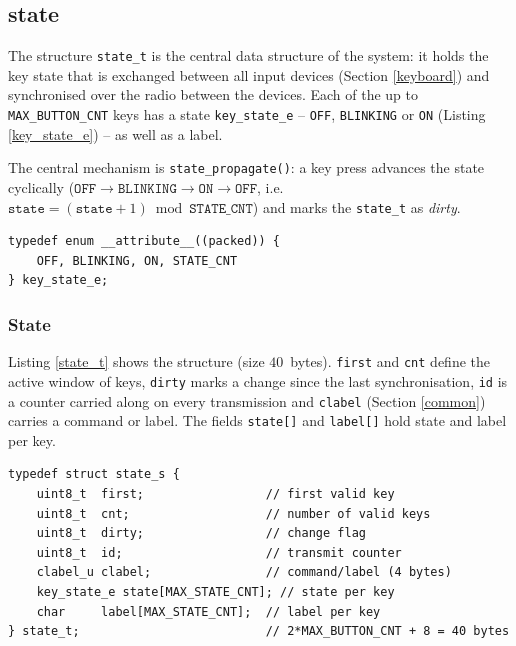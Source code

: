 \subsection{state}\label{state}
The structure \verb|state_t| is the central data structure of the system: it
holds the key state that is exchanged between all input devices (Section
\ref{keyboard}) and synchronised over the radio between the devices. Each of
the up to \verb|MAX_BUTTON_CNT| keys has a state \verb|key_state_e| --
\verb|OFF|, \verb|BLINKING| or \verb|ON| (Listing \ref{key_state_e}) -- as
well as a label.

The central mechanism is \verb|state_propagate()|: a key press advances the
state cyclically
($\mathtt{OFF} \to \mathtt{BLINKING} \to \mathtt{ON} \to \mathtt{OFF}$, i.e.\
$\mathtt{state} = (\mathtt{state}+1) \bmod \mathtt{STATE\_CNT}$) and marks the
\verb|state_t| as \emph{dirty}.

\begin{listing}
\begin{verbatim}
typedef enum __attribute__((packed)) {
    OFF, BLINKING, ON, STATE_CNT
} key_state_e;
\end{verbatim}
\caption{Key state \texttt{key\_state\_e}}
\label{key_state_e}
\end{listing}

\subsubsection*{State}
Listing \ref{state_t} shows the structure (size $40$~bytes). \verb|first| and
\verb|cnt| define the active window of keys, \verb|dirty| marks a change since
the last synchronisation, \verb|id| is a counter carried along on every
transmission and \verb|clabel| (Section \ref{common}) carries a command or
label. The fields \verb|state[]| and \verb|label[]| hold state and label per
key.

\begin{listing}
\begin{verbatim}
typedef struct state_s {
    uint8_t  first;                 // first valid key
    uint8_t  cnt;                   // number of valid keys
    uint8_t  dirty;                 // change flag
    uint8_t  id;                    // transmit counter
    clabel_u clabel;                // command/label (4 bytes)
    key_state_e state[MAX_STATE_CNT]; // state per key
    char     label[MAX_STATE_CNT];  // label per key
} state_t;                          // 2*MAX_BUTTON_CNT + 8 = 40 bytes
\end{verbatim}
\caption{Definition of the \texttt{state\_t} structure}
\label{state_t}
\end{listing}

